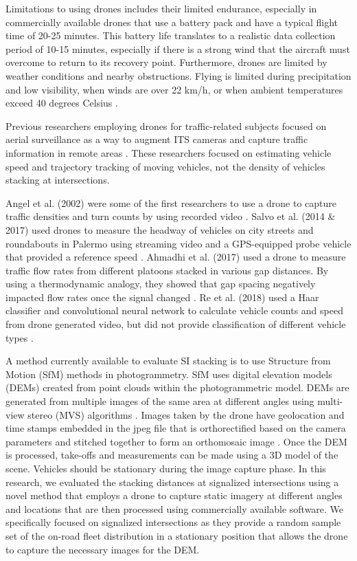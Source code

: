 Limitations to using drones includes their limited endurance, especially in commercially available drones that use a battery pack and have a typical flight time of 20-25 minutes. This battery life translates to a realistic data collection period of 10-15 minutes, especially if there is a strong wind that the aircraft must overcome to return to its recovery point. Furthermore, drones are limited by weather conditions and nearby obstructions. Flying is limited during precipitation and low visibility, when winds are over 22 km/h, or when ambient temperatures exceed 40 degrees Celsius \citep{DJI2017}.

Previous researchers employing drones for traffic-related subjects focused on aerial surveillance as a way to augment ITS cameras and capture traffic information in remote areas \citep{Reinartz2006,  Liu2013, Barmpounakis2016, Barmpounakis2017}.  These researchers focused on estimating vehicle speed and trajectory tracking of moving vehicles, not the density of vehicles stacking at intersections.

Angel et al. (2002) were some of the first researchers to use a drone to capture traffic densities and turn counts by using recorded video \citep{Angel2002}. Salvo et al. (2014 \& 2017) used drones to measure the headway of vehicles on city streets and roundabouts in Palermo using streaming video and a GPS-equipped probe vehicle that provided a reference speed \citep{Salvo2014, Salvo2017}.  Ahmadhi et al. (2017) used a drone to measure traffic flow rates from different platoons stacked in various gap distances. By using a thermodynamic analogy, they showed that gap spacing negatively impacted flow rates once the signal changed \citep{Ahmadi2017}. Re et al. (2018) used a Haar classifier and convolutional neural network to calculate vehicle counts and speed from drone generated video, but did not provide classification of different vehicle types \citep{Ke2018}. 

A method currently available to evaluate SI stacking is to use Structure from Motion (SfM) methods in photogrammetry. SfM uses digital elevation models (DEMs) created from point clouds within the photogrammetric model. DEMs are generated from multiple images of the same area at different angles using multi-view stereo (MVS) algorithms \citep{James2017}. Images taken by the drone have geolocation and time stamps embedded in the jpeg file that is orthorectified based on the camera parameters and stitched together to form an orthomosaic image \citep{Westoby2012}. Once the DEM is processed, take-offs and measurements can be made using a 3D model of the scene. Vehicles should be stationary during the image capture phase. In this research, we evaluated the stacking distances at signalized intersections using a novel method that employs a drone to capture static imagery at different angles and locations that are then processed using commercially available software. We specifically focused on signalized intersections as they provide a random sample set of the on-road fleet distribution in a stationary position that allows the drone to capture the necessary images for the DEM. 

